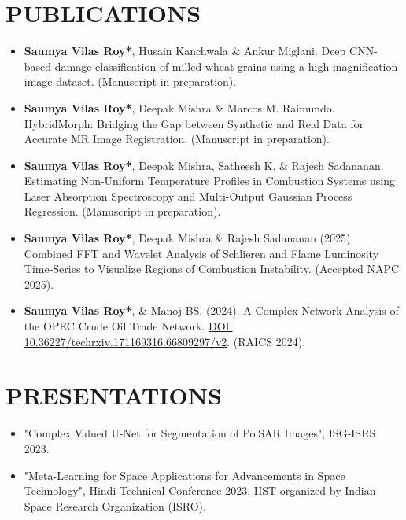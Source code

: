 \documentclass[11pt]{article}
\begin{document}
	\section*{\bf PUBLICATIONS}
	\begin{itemize}[leftmargin=*,noitemsep,topsep=0pt]
		

		\item \textbf{Saumya Vilas Roy*}, Husain Kanchwala \& Ankur Miglani. Deep CNN-based damage classification of milled wheat grains using a high-magnification image dataset. (Manuscript in preparation).
		
			\item  \textbf{Saumya Vilas Roy*}, Deepak Mishra \& Marcos M. Raimundo. HybridMorph: Bridging the Gap between Synthetic and Real Data for Accurate MR Image Registration. (Manuscript in preparation).
			
			\item \textbf{Saumya Vilas Roy*}, Deepak Mishra, Satheesh K. \& Rajesh Sadananan. Estimating Non-Uniform Temperature Profiles in Combustion Systems using Laser Absorption Spectroscopy and Multi-Output Gaussian Process Regression. (Manuscript in preparation).
			
				\item \textbf{Saumya Vilas Roy*}, Deepak Mishra \& Rajesh Sadananan (2025). Combined FFT and Wavelet Analysis of Schlieren and Flame Luminosity Time-Series to Visualize Regions of Combustion Instability. (Accepted NAPC 2025).
			
					\item \textbf{Saumya Vilas Roy*}, \& Manoj BS. (2024). A Complex Network Analysis of the OPEC Crude Oil Trade Network. \href{https://doi.org/10.36227/techrxiv.171169316.66809297/v2}{DOI: 10.36227/techrxiv.171169316.66809297/v2}. (RAICS 2024).
			
	\end{itemize}
	
	\section*{\bf PRESENTATIONS}
	\begin{itemize}[leftmargin=*,noitemsep,topsep=0pt]
		\item "Complex Valued U-Net for Segmentation of PolSAR Images", ISG-ISRS 2023.
		\item "Meta-Learning for Space Applications for Advancements in Space Technology", Hindi Technical Conference 2023, IIST organized by Indian Space Research Organization (ISRO).

	\end{itemize}
	
\end{document}
